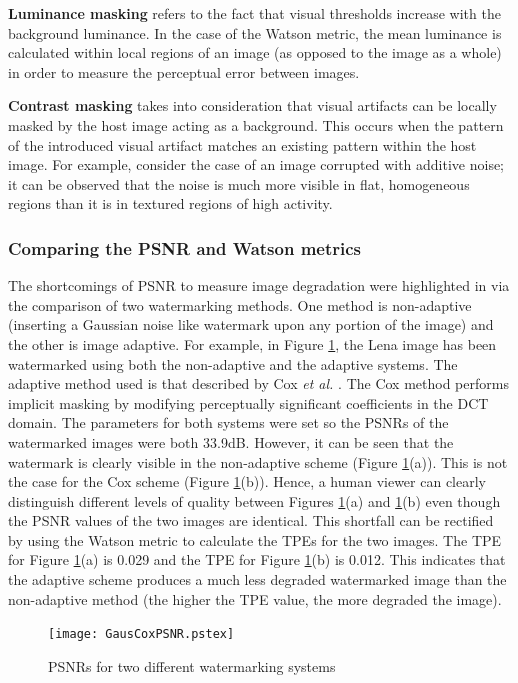 \documentclass[12pt]{report}
\begin{document}
{\bf Luminance masking} refers to the fact that visual thresholds increase with the background luminance.
In the case of the Watson metric, the mean luminance is calculated within local regions of an image (as opposed to the
image as a whole) in order to measure the perceptual error between images.

{\bf Contrast masking} takes into consideration that visual artifacts can be locally masked by the host image
acting as a background. This occurs when the pattern of the introduced visual artifact
matches an existing pattern within the host image. For example, consider the case of 
an image corrupted with additive noise; it can be observed that the noise is much more visible in 
flat, homogeneous regions than it is in textured regions of high activity.


\subsubsection{Comparing the PSNR and Watson metrics}
The shortcomings of PSNR to measure image degradation were highlighted in 
\cite{meerAtt}
via the comparison of two watermarking
methods. One method is non-adaptive (inserting a Gaussian noise like watermark 
upon any portion of the image) and the other is image adaptive.
For example, in Figure \ref{GausCox}, the Lena image has been watermarked
using both the non-adaptive
and the adaptive systems. The adaptive method used is that
described by Cox \emph{et al.} \cite{cox1}.
The Cox method performs implicit masking by modifying perceptually significant
coefficients in the DCT domain.
The parameters for both systems were set so the PSNRs of the
watermarked images were both 33.9dB. However, it can be seen that the
watermark is clearly visible
in the non-adaptive scheme (Figure \ref{GausCox}(a)). This is not the case for the
Cox scheme (Figure \ref{GausCox}(b)).
Hence, a human viewer can clearly distinguish different levels of quality between
Figures \ref{GausCox}(a) and
\ref{GausCox}(b) even though the PSNR values of the two images are identical.
This shortfall can be
rectified by using the Watson metric to calculate the TPEs for the two images. 
The TPE for Figure \ref{GausCox}(a)
is 0.029 and the TPE for Figure \ref{GausCox}(b) is 0.012. This indicates that
the adaptive scheme produces a much less degraded watermarked image than the non-adaptive method
(the higher the TPE value, the more degraded the image).

\begin{figure}[p]
        \begin{center}
                \texttt{[image: GausCoxPSNR.pstex]}
                \caption{PSNRs for two different watermarking systems}
                \label{GausCox}
        \end{center}
\end{figure}
\end{document}
